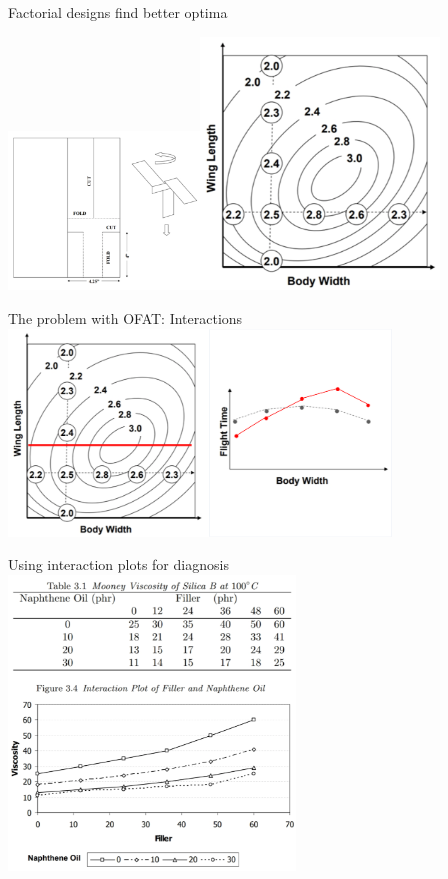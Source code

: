 \documentclass[10pt]{beamer}
\begin{document}
\begin{frame}{Factorial designs find better optima}

\includegraphics[width=2in]{figures/factorial2-1.png}\includegraphics[width=2.5in]{figures/factorial2-3.png}

\end{frame}

\begin{frame}{The problem with OFAT: Interactions}
\centering
\includegraphics[width=4in]{figures/factorial5.png}

\end{frame}

\begin{frame}{Using interaction plots for diagnosis}
\centering
\includegraphics[width=3in]{figures/factorial6.png}

\end{frame}
\end{document}

